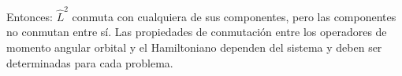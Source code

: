 Entonces: $\hat{L}^{2}$ conmuta con cualquiera de sus componentes, pero las componentes no conmutan entre sí. Las propiedades de conmutación entre los operadores de momento angular orbital y el Hamiltoniano dependen del sistema y deben ser determinadas para cada problema.
\par



